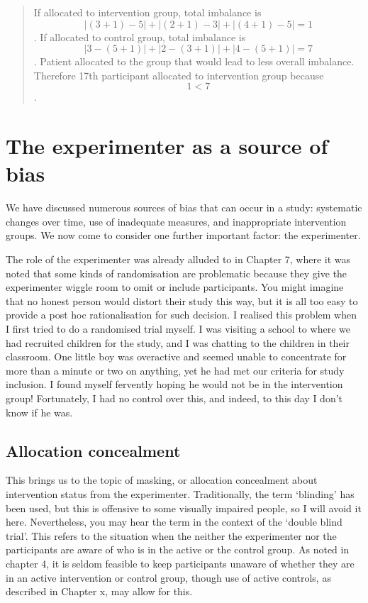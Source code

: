\documentclass[]{book}
\begin{document}
\begin{quote}
If allocated to intervention group, total imbalance is \[|(3+1)-5|+|(2+1)-3|+|(4+1)-5|=1\].
If allocated to control group, total imbalance is \[|3-(5+1)|+|2-(3+1)|+|4-(5+1)|=7\].
Patient allocated to the group that would lead to less overall imbalance.
Therefore 17th participant allocated to intervention group because \[1<7\].
\end{quote}

\hypertarget{the-experimenter-as-a-source-of-bias}{%
\chapter{The experimenter as a source of bias}\label{the-experimenter-as-a-source-of-bias}}

We have discussed numerous sources of bias that can occur in a study: systematic changes over time, use of inadequate measures, and inappropriate intervention groups. We now come to consider one further important factor: the experimenter.

The role of the experimenter was already alluded to in Chapter 7, where it was noted that some kinds of randomisation are problematic because they give the experimenter wiggle room to omit or include participants. You might imagine that no honest person would distort their study this way, but it is all too easy to provide a post hoc rationalisation for such decision. I realised this problem when I first tried to do a randomised trial myself. I was visiting a school to where we had recruited children for the study, and I was chatting to the children in their classroom. One little boy was overactive and seemed unable to concentrate for more than a minute or two on anything, yet he had met our criteria for study inclusion. I found myself fervently hoping he would not be in the intervention group! Fortunately, I had no control over this, and indeed, to this day I don't know if he was.

\hypertarget{allocation-concealment}{%
\section{Allocation concealment}\label{allocation-concealment}}

This brings us to the topic of masking, or allocation concealment about intervention status from the experimenter. Traditionally, the term `blinding' has been used, but this is offensive to some visually impaired people, so I will avoid it here. Nevertheless, you may hear the term in the context of the `double blind trial'. This refers to the situation when the neither the experimenter nor the participants are aware of who is in the active or the control group. As noted in chapter 4, it is seldom feasible to keep participants unaware of whether they are in an active intervention or control group, though use of active controls, as described in Chapter x, may allow for this.
\end{document}
